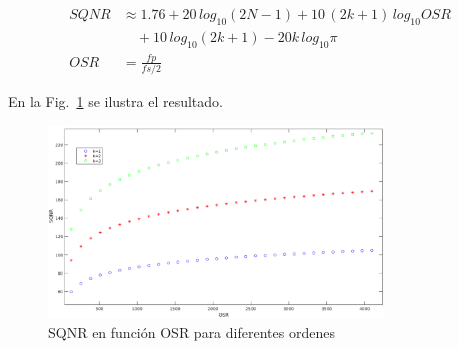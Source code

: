 \documentclass[a4paper,conference]{IEEEtran}
\begin{document}
\begin{align}
SQNR &\approx 1.76+20\,log_{10}(2N-1)+10\,(2k+1)\,log_{10}OSR\nonumber\\
&\quad
+10\,log_{10}(2k+1)-20k\,log_{10}\pi \\
OSR&=\frac{fp}{fs/2}
\end{align}

En la Fig.~\ref{fig:SQNR} se ilustra el resultado.

\begin{figure}[!t]
\centering
\includegraphics[height=2in]{SQNR_ideal_segun_OSR}
%
\caption{SQNR en funci\'on OSR para diferentes ordenes}
\label{fig:SQNR}
\end{figure}


%
%
\end{document}
